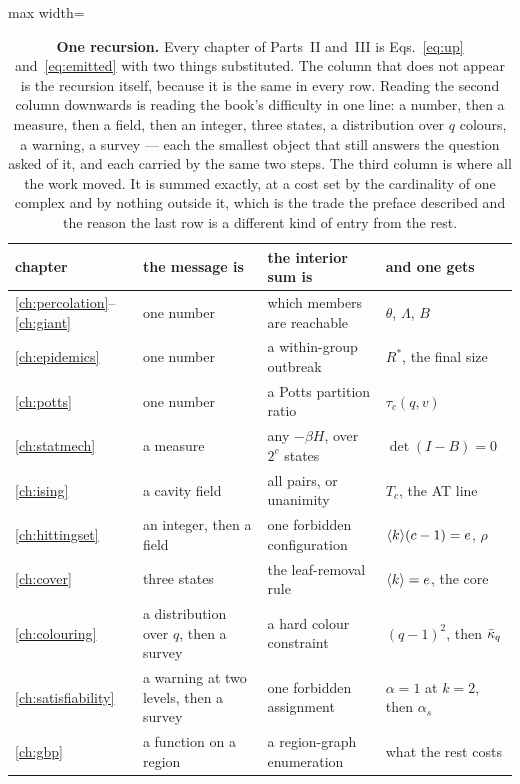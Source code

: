 \begin{table}[b]
\centering\small
\begin{adjustbox}{max width=\linewidth}
\begin{tabular}{llll}
\hline\hline
chapter & the message is & the interior sum is & and one gets\\
\hline
\ref{ch:percolation}--\ref{ch:giant} & one number
  & which members are reachable & $\theta$, $\Lambda$, $B$\\
\ref{ch:epidemics} & one number
  & a within-group outbreak & $R^{*}$, the final size\\
\ref{ch:potts} & one number
  & a Potts partition ratio & $\tau_{c}(q,v)$\\
\ref{ch:statmech} & a measure
  & any $-\beta H$, over $2^{c}$ states & $\det(I-B)=0$\\
\ref{ch:ising} & a cavity field
  & all pairs, or unanimity & $T_{c}$, the AT line\\
\ref{ch:hittingset} & an integer, then a field
  & one forbidden configuration & $\langle k \rangle(c-1)=e$, $\rho$\\
\ref{ch:cover} & three states
  & the leaf-removal rule & $\langle k \rangle=e$, the core\\
\ref{ch:colouring} & a distribution over $q$, then a survey
  & a hard colour constraint & $(q-1)^{2}$, then $\bar\kappa_{q}$\\
\ref{ch:satisfiability} & a warning at two levels, then a survey
  & one forbidden assignment & $\alpha=1$ at $k=2$, then $\alpha_{s}$\\
\ref{ch:gbp} & a function on a region
  & a region-graph enumeration & what the rest costs\\
\hline\hline
\end{tabular}
\end{adjustbox}
\caption{\textbf{One recursion.} Every chapter of Parts~II and~III is
Eqs.~\eqref{eq:up} and~\eqref{eq:emitted} with two things substituted. The
column that does not appear is the recursion itself, because it is the same in
every row. Reading the second column downwards is reading the book's difficulty
in one line: a number, then a measure, then a field, then an integer, three
states, a distribution over $q$ colours, a warning, a survey --- each the
smallest object that still answers the question asked of it, and each carried by
the same two steps. The third column is where all the work moved. It is summed
exactly, at a cost set by the cardinality of one complex and by nothing outside
it, which is the trade the preface described and the reason the last row is a
different kind of entry from the rest.}
\label{tab:through}
\end{table}

